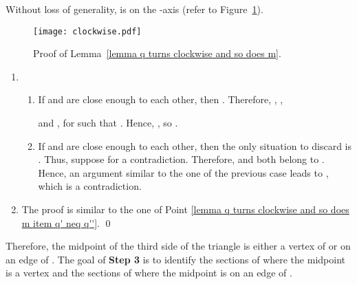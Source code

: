 \documentclass[11pt, oneside]{article}
\begin{document}
\proof Without loss of generality,
 is on the -axis
(refer to Figure~\ref{figure clockwise}).
\begin{figure}
\centering
\texttt{[image: clockwise.pdf]}
\caption{Proof of Lemma~\ref{lemma q turns clockwise and so does m}.\label{figure clockwise}}
\end{figure}
\begin{enumerate}
\item
\begin{enumerate}
\item
If  and  are close enough to each other,
then .
Therefore,
,
,

and ,
for 
such that .
Hence,
,
so .

\item
If  and  are close enough to each other,
then the only situation to discard is .
Thus,
suppose  for a contradiction.
Therefore,
 and  both belong to .
Hence,
an argument similar to the one of the previous case leads to , 
which is a contradiction.
\end{enumerate}

\item The proof is similar to the one of Point \ref{lemma q turns clockwise and so does m item q' neq q''}.
\qed
\end{enumerate}

Therefore,
the midpoint  of the third side of the triangle
is either a vertex of 
or on an edge of .
The goal of {\bf Step 3} is to identify 
the sections of 
where the midpoint is a vertex
and the sections of 
where the midpoint is on an edge of .
\end{document}
